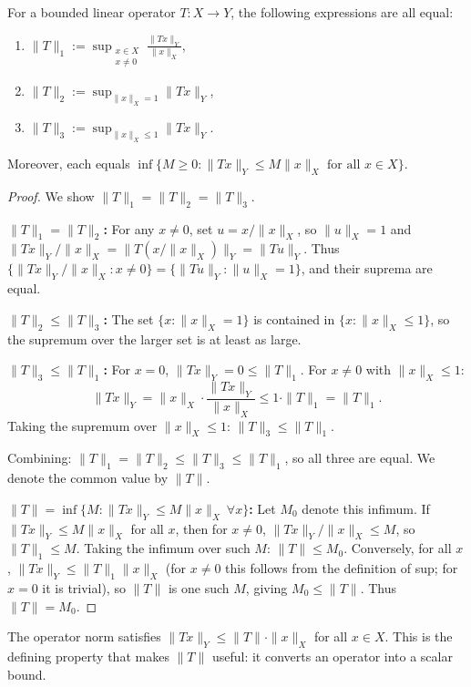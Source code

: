 \documentclass[11pt,a4paper]{article}
\begin{document}
\begin{proposition}
\label{prop:op_norm_equiv}
For a bounded linear operator $T \colon X \to Y$, the following expressions
are all equal:
\begin{enumerate}[nosep,label=(\roman*)]
  \item $\displaystyle \|T\|_1 := \sup_{\substack{x \in X \\ x \ne 0}}
    \frac{\|Tx\|_Y}{\|x\|_X}$,
  \item $\displaystyle \|T\|_2 := \sup_{\|x\|_X = 1} \|Tx\|_Y$,
  \item $\displaystyle \|T\|_3 := \sup_{\|x\|_X \le 1} \|Tx\|_Y$.
\end{enumerate}
Moreover, each equals $\inf\{M \ge 0 : \|Tx\|_Y \le M\|x\|_X
\text{ for all } x \in X\}$.
\end{proposition}

\begin{proof}
We show $\|T\|_1 = \|T\|_2 = \|T\|_3$.

\textbf{$\|T\|_1 = \|T\|_2$:} For any $x \ne 0$, set $u = x / \|x\|_X$, so
$\|u\|_X = 1$ and $\|Tx\|_Y / \|x\|_X = \|T(x/\|x\|_X)\|_Y = \|Tu\|_Y$.
Thus $\{{\|Tx\|_Y}/{\|x\|_X} : x \ne 0\} = \{\|Tu\|_Y : \|u\|_X = 1\}$,
and their suprema are equal.

\textbf{$\|T\|_2 \le \|T\|_3$:} The set $\{x : \|x\|_X = 1\}$ is contained
in $\{x : \|x\|_X \le 1\}$, so the supremum over the larger set is at least
as large.

\textbf{$\|T\|_3 \le \|T\|_1$:} For $x = 0$, $\|Tx\|_Y = 0 \le \|T\|_1$.
For $x \ne 0$ with $\|x\|_X \le 1$:
\[
\|Tx\|_Y = \|x\|_X \cdot \frac{\|Tx\|_Y}{\|x\|_X}
\le 1 \cdot \|T\|_1 = \|T\|_1.
\]
Taking the supremum over $\|x\|_X \le 1$: $\|T\|_3 \le \|T\|_1$.

Combining: $\|T\|_1 = \|T\|_2 \le \|T\|_3 \le \|T\|_1$, so all three are
equal. We denote the common value by $\|T\|$.

\textbf{$\|T\| = \inf\{M : \|Tx\|_Y \le M\|x\|_X \ \forall x\}$:}
Let $M_0$ denote this infimum. If $\|Tx\|_Y \le M\|x\|_X$ for all $x$, then
for $x \ne 0$, $\|Tx\|_Y/\|x\|_X \le M$, so $\|T\|_1 \le M$. Taking the
infimum over such $M$: $\|T\| \le M_0$. Conversely, for all $x$,
$\|Tx\|_Y \le \|T\|_1 \|x\|_X$ (for $x \ne 0$ this follows from the
definition of sup; for $x = 0$ it is trivial), so $\|T\|$ is one such $M$,
giving $M_0 \le \|T\|$. Thus $\|T\| = M_0$.
\end{proof}

\begin{remark}
The operator norm satisfies $\|Tx\|_Y \le \|T\| \cdot \|x\|_X$ for all
$x \in X$. This is the defining property that makes $\|T\|$ useful: it
converts an operator into a scalar bound.
\end{remark}
\end{document}
